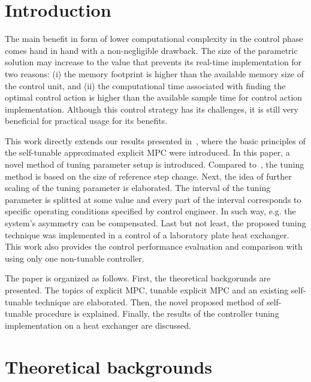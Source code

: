 \documentclass[preprint,12pt]{elsarticle}
\begin{document}
	
	\section{Introduction}
	\label{sec:introduction}
	
	

	
	The main benefit in form of lower computational complexity in the control phase comes hand in hand with a non-negligible drawback. The size of the parametric solution may increase to the value that prevents its real-time implementation for two reasons: (i) the memory footprint is higher than the available memory size of the control unit, and (ii) the computational time associated with finding the optimal control action is higher than the available sample time for control action implementation. Although this control strategy has its challenges, it is still very beneficial for practical usage for its benefits. 
	
	
	This work directly extends our results presented in~\cite{self_tunable}, where the basic principles of the self-tunable approximated explicit MPC were introduced. In this paper, a novel method of tuning parameter setup is introduced. Compared to~\cite{self_tunable}, the tuning method is based on the size of reference step change. Next, the idea of further scaling of the tuning parameter is elaborated. The interval of the tuning parameter is splitted at some value and every part of the interval corresponds to specific operating conditions specified by control engineer. In such way, e.g. the system's asymmetry can be compensated. Last but not least, the proposed tuning technique was implemented in a control of a laboratory plate heat exchanger. This work also provides the control performance evaluation and comparison with using only one non-tunable controller.    
	
	The paper is organized as follows. First, the theoretical backgorunds are presented. The topics of explicit MPC, tunable explicit MPC and an existing self-tunable technique are elaborated. Then, the novel proposed method of self-tunable procedure is explained. Finally, the results of the controller tuning implementation on a heat exchanger are discussed.
	
	\section{Theoretical backgrounds}
	\label{sec:preliminaries}
	
\end{document}

